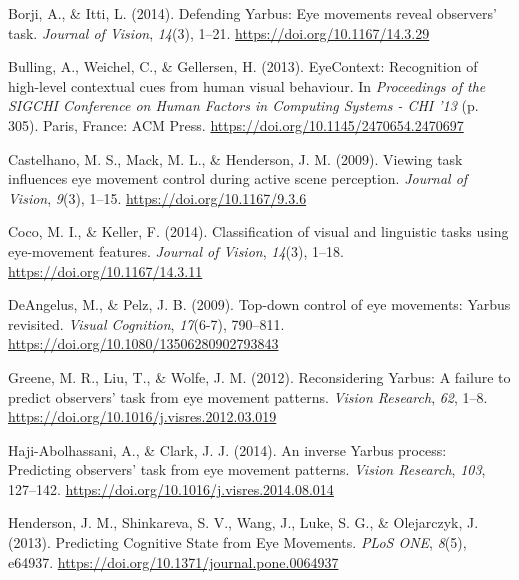\documentclass[
  english,
  man, donotrepeattitle,floatsintext]{apa6}
\begin{document}
\leavevmode\hypertarget{ref-borjiDefendingYarbusEye2014}{}%
Borji, A., \& Itti, L. (2014). Defending Yarbus: Eye movements reveal observers' task. \emph{Journal of Vision}, \emph{14}(3), 1--21. \url{https://doi.org/10.1167/14.3.29}

\leavevmode\hypertarget{ref-bullingEyeContextRecognitionHighlevel2013a}{}%
Bulling, A., Weichel, C., \& Gellersen, H. (2013). EyeContext: Recognition of high-level contextual cues from human visual behaviour. In \emph{Proceedings of the SIGCHI Conference on Human Factors in Computing Systems - CHI '13} (p. 305). Paris, France: ACM Press. \url{https://doi.org/10.1145/2470654.2470697}

\leavevmode\hypertarget{ref-castelhanoViewingTaskInfluences2009a}{}%
Castelhano, M. S., Mack, M. L., \& Henderson, J. M. (2009). Viewing task influences eye movement control during active scene perception. \emph{Journal of Vision}, \emph{9}(3), 1--15. \url{https://doi.org/10.1167/9.3.6}

\leavevmode\hypertarget{ref-cocoClassificationVisualLinguistic2014a}{}%
Coco, M. I., \& Keller, F. (2014). Classification of visual and linguistic tasks using eye-movement features. \emph{Journal of Vision}, \emph{14}(3), 1--18. \url{https://doi.org/10.1167/14.3.11}

\leavevmode\hypertarget{ref-deangelusTopdownControlEye2009a}{}%
DeAngelus, M., \& Pelz, J. B. (2009). Top-down control of eye movements: Yarbus revisited. \emph{Visual Cognition}, \emph{17}(6-7), 790--811. \url{https://doi.org/10.1080/13506280902793843}

\leavevmode\hypertarget{ref-greeneReconsideringYarbusFailure2012c}{}%
Greene, M. R., Liu, T., \& Wolfe, J. M. (2012). Reconsidering Yarbus: A failure to predict observers' task from eye movement patterns. \emph{Vision Research}, \emph{62}, 1--8. \url{https://doi.org/10.1016/j.visres.2012.03.019}

\leavevmode\hypertarget{ref-haji-abolhassaniInverseYarbusProcess2014c}{}%
Haji-Abolhassani, A., \& Clark, J. J. (2014). An inverse Yarbus process: Predicting observers' task from eye movement patterns. \emph{Vision Research}, \emph{103}, 127--142. \url{https://doi.org/10.1016/j.visres.2014.08.014}

\leavevmode\hypertarget{ref-hendersonPredictingCognitiveState2013c}{}%
Henderson, J. M., Shinkareva, S. V., Wang, J., Luke, S. G., \& Olejarczyk, J. (2013). Predicting Cognitive State from Eye Movements. \emph{PLoS ONE}, \emph{8}(5), e64937. \url{https://doi.org/10.1371/journal.pone.0064937}
\end{document}
